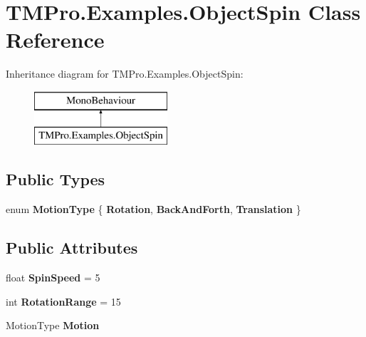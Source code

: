 \hypertarget{class_t_m_pro_1_1_examples_1_1_object_spin}{}\section{T\+M\+Pro.\+Examples.\+Object\+Spin Class Reference}
\label{class_t_m_pro_1_1_examples_1_1_object_spin}
Inheritance diagram for T\+M\+Pro.\+Examples.\+Object\+Spin\+:\begin{figure}[H]
\begin{center}
\leavevmode
\includegraphics[height=2.000000cm]{class_t_m_pro_1_1_examples_1_1_object_spin}
\end{center}
\end{figure}
\subsection*{Public Types}
\begin{DoxyCompactItemize}
\item 
\mbox{\label{class_t_m_pro_1_1_examples_1_1_object_spin_a45f51bc7820e9bbc91c1806bcaded7fc}} 
enum {\bfseries Motion\+Type} \{ {\bfseries Rotation}, 
{\bfseries Back\+And\+Forth}, 
{\bfseries Translation}
 \}
\end{DoxyCompactItemize}
\subsection*{Public Attributes}
\begin{DoxyCompactItemize}
\item 
\mbox{\label{class_t_m_pro_1_1_examples_1_1_object_spin_a4b1d0b19553122b485c5878fe45ea0b3}} 
float {\bfseries Spin\+Speed} = 5
\item 
\mbox{\label{class_t_m_pro_1_1_examples_1_1_object_spin_a802c4f5441264532dd2b379c48dfa012}} 
int {\bfseries Rotation\+Range} = 15
\item 
\mbox{\label{class_t_m_pro_1_1_examples_1_1_object_spin_ae422bdffcabfc75fae2c0bad902124f1}} 
Motion\+Type {\bfseries Motion}
\end{DoxyCompactItemize}
